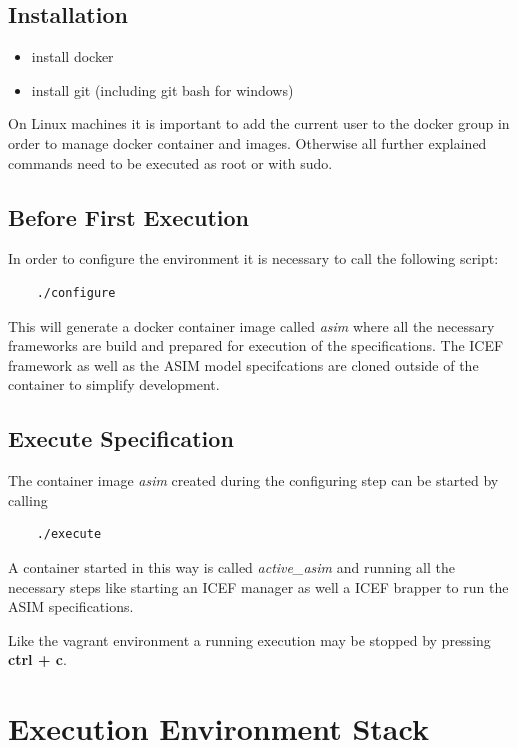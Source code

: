 \subsection{Installation}

\begin{itemize}
	\item install docker
	\item install git (including git bash for windows)
\end{itemize}

On Linux machines it is important to add the current user to the docker group in order to manage docker container and images. Otherwise all further explained commands need to be executed as root or with sudo.

\subsection{Before First Execution}

In order to configure the environment it is necessary to call the following script:

\begin{lstlisting}
	./configure
\end{lstlisting}

This will generate a docker container image called \textit{asim} where all the necessary frameworks are build and prepared for execution of the specifications. The ICEF framework as well as the ASIM model specifcations are cloned outside of the container to simplify development.

\subsection{Execute Specification}

The container image \textit{asim} created during the configuring step can be started by calling

\begin{lstlisting}
	./execute
\end{lstlisting}

A container started in this way is called \textit{active\_asim} and running all the necessary steps like starting an ICEF manager as well a ICEF brapper to run the ASIM specifications.

Like the vagrant environment a running execution may be stopped by pressing \textbf{ctrl + c}.

\section{Execution Environment Stack}
\label{sec:exec-env-stack}

